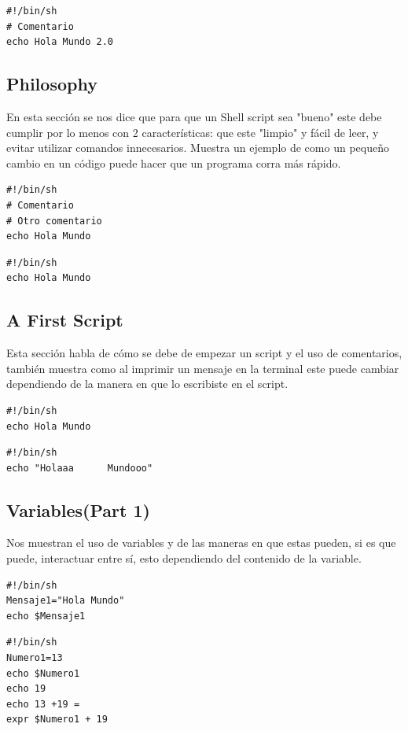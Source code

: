\documentclass{article}
\begin{document}
\begin{verbatim}
#!/bin/sh
# Comentario
echo Hola Mundo 2.0	
\end{verbatim}

\subsection{Philosophy}
En esta sección se nos dice que para que un Shell script sea "bueno" este debe cumplir por lo menos con 2 características: que este "limpio" y fácil de leer, y evitar utilizar comandos innecesarios. Muestra un ejemplo de como un pequeño cambio en un código puede hacer que un programa corra más rápido.

\begin{verbatim}
#!/bin/sh
# Comentario
# Otro comentario 
echo Hola Mundo	
\end{verbatim}

\begin{verbatim}
#!/bin/sh
echo Hola Mundo	
\end{verbatim}

\subsection{A First Script}
Esta sección habla de cómo se debe de empezar un script y el uso de comentarios, también muestra como al imprimir un mensaje en la terminal este puede cambiar dependiendo de la manera en que lo escribiste en el script.

\begin{verbatim}
#!/bin/sh
echo Hola Mundo	
\end{verbatim}

\begin{verbatim}
#!/bin/sh
echo "Holaaa      Mundooo"	
\end{verbatim}

\subsection{Variables(Part 1)}
Nos muestran el uso de variables y de las maneras en que estas pueden, si es que puede, interactuar entre sí, esto dependiendo del contenido de la variable.

\begin{verbatim}
#!/bin/sh
Mensaje1="Hola Mundo"
echo $Mensaje1
\end{verbatim}

\begin{verbatim}
#!/bin/sh
Numero1=13
echo $Numero1
echo 19
echo 13 +19 =
expr $Numero1 + 19
\end{verbatim}
\end{document}
